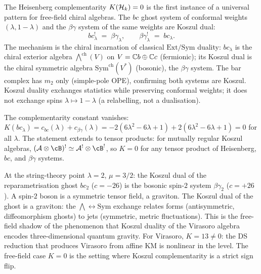 \begin{remark}
\label{rem:rosetta-bc-betagamma-koszul}
%
%
The Heisenberg complementarity $K(\mathcal{H}_k) = 0$ is the first instance of a universal pattern for free-field chiral algebras. The $bc$ ghost system of conformal weights $(\lambda, 1-\lambda)$ and the $\beta\gamma$ system of the same weights are Koszul dual:
\[
bc_\lambda^! \;=\; \beta\gamma_\lambda,
\qquad
\beta\gamma_\lambda^! \;=\; bc_\lambda.
\]
The mechanism is the chiral incarnation of classical $\mathrm{Ext}/\mathrm{Sym}$ duality: $bc_\lambda$ is the chiral exterior algebra $\bigwedge^{\mathrm{ch}}(V)$ on $V = \mathbb{C} b \oplus \mathbb{C} c$ (fermionic); its Koszul dual is the chiral symmetric algebra $\mathrm{Sym}^{\mathrm{ch}}(V^*)$ (bosonic), the $\beta\gamma$ system. The bar complex has $m_2$ only (simple-pole OPE), confirming both systems are Koszul. Koszul duality exchanges statistics while preserving conformal weights; it does not exchange spins $\lambda \mapsto 1 - \lambda$ (a relabelling, not a dualisation).

The complementarity constant vanishes: $K(bc_\lambda) = c_{bc}(\lambda) + c_{\beta\gamma}(\lambda) = -2(6\lambda^2 - 6\lambda + 1) + 2(6\lambda^2 - 6\lambda + 1) = 0$ for all $\lambda$. The statement extends to tensor products: for mutually regular Koszul algebras, $(\cA \otimes \cB)^! \simeq \cA^! \otimes \cB^!$, so $K = 0$ for any tensor product of Heisenberg, $bc$, and $\beta\gamma$ systems.

At the string-theory point $\lambda = 2$, $\mu = 3/2$: the Koszul dual of the reparametrisation ghost $bc_2$ ($c = -26$) is the bosonic spin-$2$ system $\beta\gamma_2$ ($c = +26$). A spin-$2$ boson is a symmetric tensor field, a graviton. The Koszul dual of the ghost is a graviton: the $\bigwedge \leftrightarrow \mathrm{Sym}$ exchange relates forms (antisymmetric, diffeomorphism ghosts) to jets (symmetric, metric fluctuations). This is the free-field shadow of the phenomenon that Koszul duality of the Virasoro algebra encodes three-dimensional quantum gravity. For Virasoro, $K = 13 \neq 0$: the DS reduction that produces Virasoro from affine KM is nonlinear in the level. The free-field case $K = 0$ is the setting where Koszul complementarity is a strict sign flip.
\end{remark}

